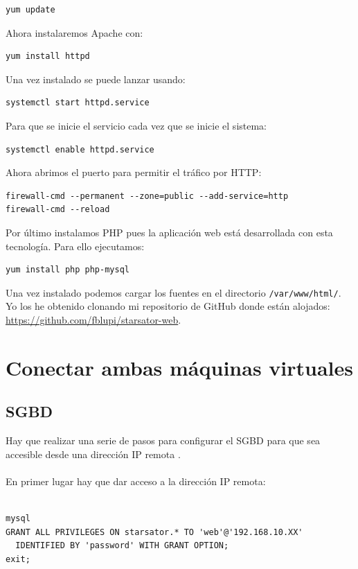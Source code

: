 \begin{lstlisting}
yum update
\end{lstlisting}

Ahora instalaremos Apache con:

\begin{lstlisting}
yum install httpd
\end{lstlisting}

Una vez instalado se puede lanzar usando:

\begin{lstlisting}
systemctl start httpd.service
\end{lstlisting}

Para que se inicie el servicio cada vez que se inicie el sistema:

\begin{lstlisting}
systemctl enable httpd.service
\end{lstlisting}

Ahora abrimos el puerto para permitir el tráfico por HTTP:

\begin{lstlisting}
firewall-cmd --permanent --zone=public --add-service=http
firewall-cmd --reload
\end{lstlisting}

Por último instalamos PHP pues la aplicación web está desarrollada con esta tecnología. Para ello ejecutamos:

\begin{lstlisting}
yum install php php-mysql
\end{lstlisting}

Una vez instalado podemos cargar los fuentes en el directorio \texttt{/var/www/html/}. Yo los he obtenido clonando mi repositorio de GitHub donde están alojados: \url{https://github.com/fblupi/starsator-web}.

\section{Conectar ambas máquinas virtuales}

\subsection{SGBD}
\label{sec:conectar-mvs-sgbd}

Hay que realizar una serie de pasos para configurar el SGBD para que sea accesible desde una dirección IP remota \cite{EnableRemoteAccessToMariaDB}.
\\ \\
En primer lugar hay que dar acceso a la dirección IP remota:
\\ \\
\begin{lstlisting}
mysql
GRANT ALL PRIVILEGES ON starsator.* TO 'web'@'192.168.10.XX' 
  IDENTIFIED BY 'password' WITH GRANT OPTION;
exit;
\end{lstlisting}

